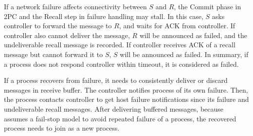  If a network failure affects connectivity between $S$ and $R$, the Commit phase in 2PC and the Recall step in failure handling may stall. %
In this case, $S$ asks controller to forward the message to $R$, and waits for ACK from controller. If controller also cannot deliver the message, $R$ will be announced as failed, and the undeliverable recall message is recorded. If controller receives ACK of a recall message but cannot forward it to $S$, $S$ will be announced as failed. In summary, if a process does not respond controller within timeout, it is considered as failed.

 If a process recovers from failure,  %
it needs to consistently deliver or discard messages in receive buffer. The controller notifies process of its own failure. Then, the process contacts controller to get host failure notifications since its failure and undeliverable recall messages. After delivering buffered messages, because \sys{} assumes a fail-stop model to avoid repeated failure of a process, the recovered process needs to join \sys{} as a new process.







